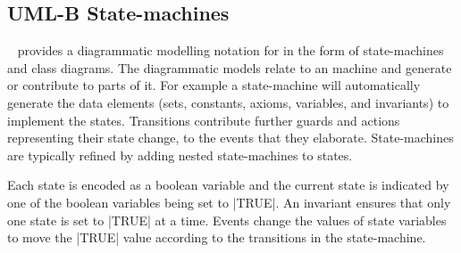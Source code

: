 
\subsection{UML-B State-machines}
\label{sec:iumlb}

\UMLB~\cite{said15:umlbSosym,snook14:iumlbStatem,snook06umlbTosem} provides a diagrammatic modelling notation for \EventB in the form of state-machines and class diagrams. 
The diagrammatic models relate to an \EventB machine and generate or contribute to parts of it. 
For example a state-machine will automatically generate the \EventB data elements (sets, constants, axioms, variables, and invariants) to implement the states. 
Transitions contribute further guards and actions representing their state change, to the events that they elaborate.  
State-machines are typically refined by adding nested state-machines to states.

Each state is encoded as a boolean variable and the current state is indicated by one of the boolean variables being set to |TRUE|. 
An invariant ensures that only one state is set to |TRUE| at a time.
Events change the values of state variables to move the |TRUE| value according to the transitions in the state-machine.  
	
